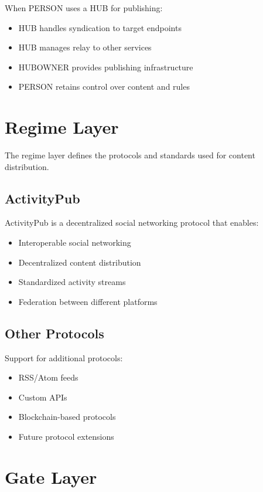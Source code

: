 \documentclass[11pt]{article}
\begin{document}
When PERSON uses a HUB for publishing:
\begin{itemize}
    \item HUB handles syndication to target endpoints
    \item HUB manages relay to other services
    \item HUBOWNER provides publishing infrastructure
    \item PERSON retains control over content and rules
\end{itemize}

\section{Regime Layer}

The regime layer defines the protocols and standards used for content distribution.

\subsection{ActivityPub}

ActivityPub is a decentralized social networking protocol that enables:
\begin{itemize}
    \item Interoperable social networking
    \item Decentralized content distribution
    \item Standardized activity streams
    \item Federation between different platforms
\end{itemize}

\subsection{Other Protocols}

Support for additional protocols:
\begin{itemize}
    \item RSS/Atom feeds
    \item Custom APIs
    \item Blockchain-based protocols
    \item Future protocol extensions
\end{itemize}

\section{Gate Layer}
\end{document}
